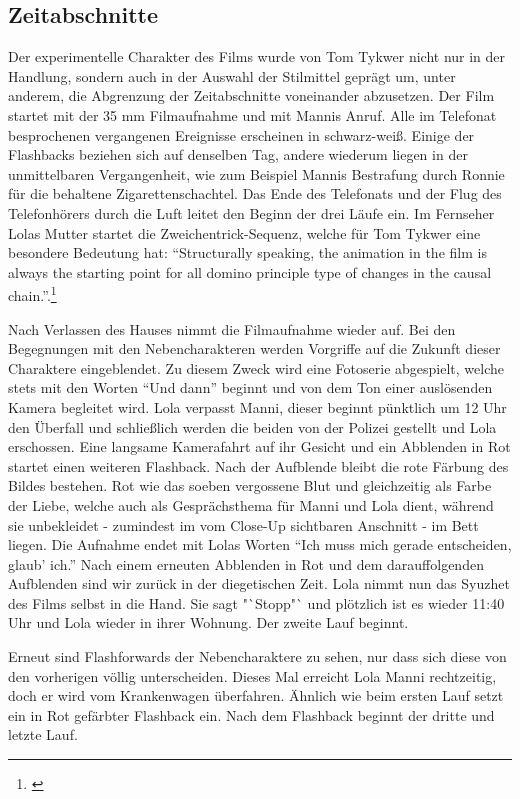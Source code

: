 \subsection{Zeitabschnitte}

Der experimentelle Charakter des Films wurde von Tom Tykwer nicht nur in der Handlung, sondern auch in der Auswahl der Stilmittel geprägt um, unter anderem, die Abgrenzung der Zeitabschnitte voneinander abzusetzen. Der Film startet mit der 35 mm Filmaufnahme und mit Mannis Anruf. Alle im Telefonat besprochenen vergangenen Ereignisse erscheinen in schwarz-weiß. Einige der Flashbacks beziehen sich auf denselben Tag, andere wiederum liegen in der unmittelbaren Vergangenheit, wie zum Beispiel Mannis Bestrafung durch Ronnie für die behaltene Zigarettenschachtel. Das Ende des Telefonats und der Flug des Telefonhörers durch die Luft leitet den Beginn der drei Läufe ein. Im Fernseher Lolas Mutter startet die Zweichentrick-Sequenz, welche für Tom Tykwer eine besondere Bedeutung hat: “Structurally speaking, the animation in the film is always the starting point for all domino principle type of changes in the causal chain.”.\footnote{\cite{AnythingRuns}}

Nach Verlassen des Hauses nimmt die Filmaufnahme wieder auf. Bei den Begegnungen mit den Nebencharakteren werden Vorgriffe auf die Zukunft dieser Charaktere eingeblendet. Zu diesem Zweck wird eine Fotoserie abgespielt, welche stets mit den Worten "`Und dann"' beginnt und von dem Ton einer auslösenden Kamera begleitet wird. Lola verpasst Manni, dieser beginnt pünktlich um 12 Uhr den Überfall und schließlich werden die beiden von der Polizei gestellt und Lola erschossen. Eine langsame Kamerafahrt auf ihr Gesicht und ein Abblenden in Rot startet einen weiteren Flashback. Nach der Aufblende bleibt die rote Färbung des Bildes bestehen. Rot wie das soeben vergossene Blut und gleichzeitig als Farbe der Liebe, welche auch als Gesprächsthema für Manni und Lola dient, während sie unbekleidet - zumindest im vom Close-Up sichtbaren Anschnitt - im Bett liegen. Die Aufnahme endet mit Lolas Worten "`Ich muss mich gerade entscheiden, glaub' ich."' Nach einem erneuten Abblenden in Rot und dem darauffolgenden Aufblenden sind wir zurück in der diegetischen Zeit. Lola nimmt nun das Syuzhet des Films selbst in die Hand. Sie sagt "`Stopp"` und plötzlich ist es wieder 11:40 Uhr und Lola wieder in ihrer Wohnung. Der zweite Lauf beginnt.

Erneut sind Flashforwards der Nebencharaktere zu sehen, nur dass sich diese von den vorherigen völlig unterscheiden. Dieses Mal erreicht Lola Manni rechtzeitig, doch er wird vom Krankenwagen überfahren. Ähnlich wie beim ersten Lauf setzt ein in Rot gefärbter Flashback ein. Nach dem Flashback beginnt der dritte und letzte Lauf.


